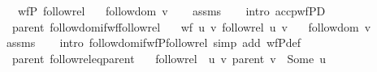 \begin{isabellebody}
\ \ \ {\isachardoublequoteopen}wfP\ follow{\isacharunderscore}{\kern0pt}rel{\isachardoublequoteclose}\isanewline
\ \ \ {\isachardoublequoteopen}follow{\isacharunderscore}{\kern0pt}dom\ v{\isachardoublequoteclose}%
\endisataginvisible
{\isafoldinvisible}%
%
\isadeliminvisible
\isanewline
%
\endisadeliminvisible
%
\isadelimproof
\ \ %
\endisadelimproof
%
\isatagproof
{}\isamarkupfalse%
\ assms\isanewline
\ \ \isamarkupfalse%
\ {\isacharparenleft}{\kern0pt}intro\ accp{\isacharunderscore}{\kern0pt}wfPD{\isacharparenright}{\kern0pt}%
\endisatagproof
{\isafoldproof}%
%
\isadelimproof
\isanewline
%
\endisadelimproof
%
\isadeliminvisible
\isanewline
%
\endisadeliminvisible
%
\isataginvisible
{}\isamarkupfalse%
\ {\isacharparenleft}{\kern0pt}\ parent{\isacharparenright}{\kern0pt}\ follow{\isacharunderscore}{\kern0pt}dom{\isacharunderscore}{\kern0pt}if{\isacharunderscore}{\kern0pt}wf{\isacharunderscore}{\kern0pt}follow{\isacharunderscore}{\kern0pt}rel{\isacharcolon}{\kern0pt}\isanewline
\ \ \ {\isachardoublequoteopen}wf\ {\isacharbraceleft}{\kern0pt}{\isacharparenleft}{\kern0pt}u{\isacharcomma}{\kern0pt}\ v{\isacharparenright}{\kern0pt}{\isachardot}{\kern0pt}\ follow{\isacharunderscore}{\kern0pt}rel\ u\ v{\isacharbraceright}{\kern0pt}{\isachardoublequoteclose}\isanewline
\ \ \ {\isachardoublequoteopen}follow{\isacharunderscore}{\kern0pt}dom\ v{\isachardoublequoteclose}%
\endisataginvisible
{\isafoldinvisible}%
%
\isadeliminvisible
\isanewline
%
\endisadeliminvisible
%
\isadelimproof
\ \ %
\endisadelimproof
%
\isatagproof
{}\isamarkupfalse%
\ assms\isanewline
\ \ \isamarkupfalse%
\ {\isacharparenleft}{\kern0pt}intro\ follow{\isacharunderscore}{\kern0pt}dom{\isacharunderscore}{\kern0pt}if{\isacharunderscore}{\kern0pt}wfP{\isacharunderscore}{\kern0pt}follow{\isacharunderscore}{\kern0pt}rel{\isacharparenright}{\kern0pt}\ {\isacharparenleft}{\kern0pt}simp\ add{\isacharcolon}{\kern0pt}\ wfP{\isacharunderscore}{\kern0pt}def{\isacharparenright}{\kern0pt}%
\endisatagproof
{\isafoldproof}%
%
\isadelimproof
\isanewline
%
\endisadelimproof
%
\isadeliminvisible
\isanewline
%
\endisadeliminvisible
%
\isataginvisible
{}\isamarkupfalse%
\ {\isacharparenleft}{\kern0pt}\ parent{\isacharparenright}{\kern0pt}\ follow{\isacharunderscore}{\kern0pt}rel{\isacharunderscore}{\kern0pt}eq{\isacharunderscore}{\kern0pt}parent{\isacharcolon}{\kern0pt}\isanewline
\ \ \ {\isachardoublequoteopen}follow{\isacharunderscore}{\kern0pt}rel\ {\isacharequal}{\kern0pt}\ {\isacharparenleft}{\kern0pt}{\isasymlambda}u\ v{\isachardot}{\kern0pt}\ parent\ v\ {\isacharequal}{\kern0pt}\ Some\ u{\isacharparenright}{\kern0pt}{\isachardoublequoteclose}%

\end{isabellebody}
